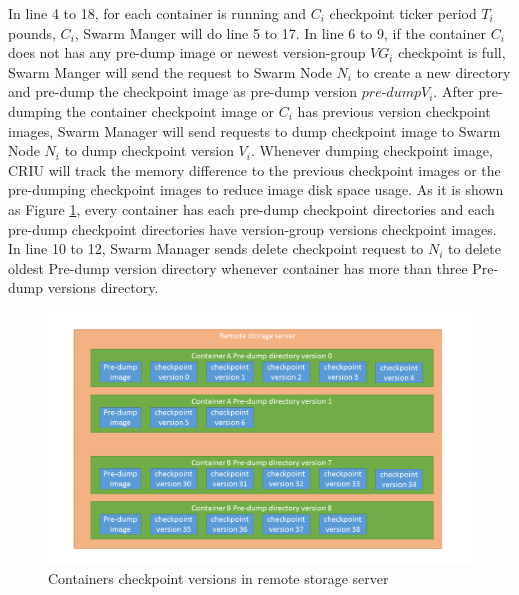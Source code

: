 In line 4 to 18, for each container is running and $C_i$ checkpoint ticker period $T_i$ pounds, $C_i$, Swarm Manger will do line 5 to 17.
In line 6 to 9, if the container $C_i$ does not has any pre-dump image or newest version-group $VG_i$ checkpoint is full, Swarm Manger will send the request to Swarm Node $N_i$ to create a new directory and pre-dump the checkpoint image as pre-dump version $pre$-$dump V_i$.
After pre-dumping the container checkpoint image or $C_i$ has previous version checkpoint images, Swarm Manager will send requests to dump checkpoint image to Swarm Node $N_i$ to dump checkpoint version $V_i$. Whenever dumping checkpoint image, CRIU will track the memory difference to the previous checkpoint images or the pre-dumping checkpoint images to reduce image disk space usage.
As it is shown as Figure \ref{fig:Containers checkpoint versions in remote storage server}, every container has each pre-dump checkpoint directories and each pre-dump checkpoint directories have version-group versions checkpoint images.
In line 10 to 12, Swarm Manager sends delete checkpoint request to $N_i$ to delete oldest Pre-dump version directory whenever container has more than three Pre-dump versions directory. 

\begin{figure}[h]
\begin{center}
\includegraphics[width=15cm]{figure/checkpoint_demo.png}
\end{center}
\caption{Containers checkpoint versions in remote storage server}
\label{fig:Containers checkpoint versions in remote storage server}
\end{figure}

